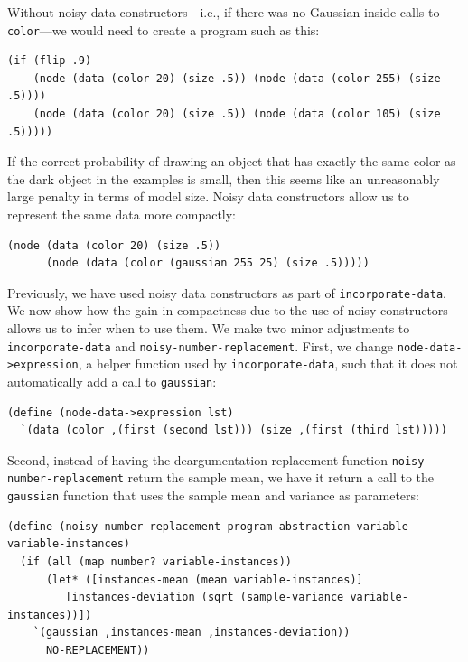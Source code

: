 \documentclass[a4paper,10pt]{article}
\begin{document}
Without noisy data constructors---i.e., if there was no Gaussian inside calls to \texttt{color}---we would need to create a program such as this:
\begin{lstlisting}
(if (flip .9)
    (node (data (color 20) (size .5)) (node (data (color 255) (size .5))))
    (node (data (color 20) (size .5)) (node (data (color 105) (size .5)))))
\end{lstlisting}
If the correct probability of drawing an object that has exactly the same color as the dark object in the examples is small, then this seems like an unreasonably large penalty in terms of model size. Noisy data constructors allow us to represent the same data more compactly:
\begin{lstlisting}
(node (data (color 20) (size .5))
      (node (data (color (gaussian 255 25) (size .5)))))
\end{lstlisting}
Previously, we have used noisy data constructors as part of \texttt{incorporate-data}. We now show how the gain in compactness due to the use of noisy constructors allows us to infer when to use them. We make two minor adjustments to \texttt{incorporate-data} and \texttt{noisy-number-replacement}. First, we change \texttt{node-data->expression}, a helper function used by \texttt{incorporate-data}, such that it does not automatically add a call to \texttt{gaussian}:
\begin{lstlisting}[frame=trblsingle]
(define (node-data->expression lst)
  `(data (color ,(first (second lst))) (size ,(first (third lst)))))
\end{lstlisting}
Second, instead of having the deargumentation replacement function \texttt{noisy-number-replacement} return the sample mean, we have it return a call to the \texttt{gaussian} function that uses the sample mean and variance as parameters:
\begin{lstlisting}[frame=trblsingle]
(define (noisy-number-replacement program abstraction variable variable-instances)
  (if (all (map number? variable-instances))
      (let* ([instances-mean (mean variable-instances)]
	     [instances-deviation (sqrt (sample-variance variable-instances))])
	`(gaussian ,instances-mean ,instances-deviation))
      NO-REPLACEMENT))
\end{lstlisting}
\end{document}
